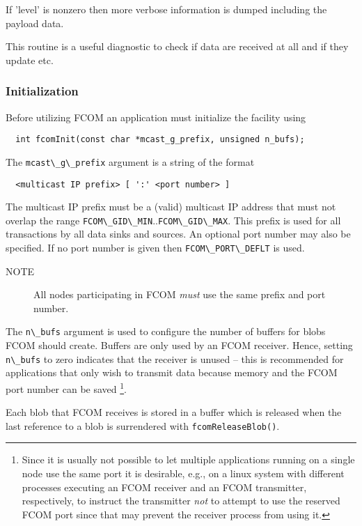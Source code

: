 \documentclass[11pt]{article}
\newcommand{\fcom}{FCOM}
\newcommand{\blob}{blob}
\newcommand{\cstl}[1]{{\lstinline+#1+}}
\newcommand{\note}[1]{
	\begin{description}
		\item[NOTE] #1
	\end{description}
}
\begin{document}
	  If 'level' is nonzero then more verbose information
      is dumped including the payload data.

	  This routine is a useful diagnostic to check if data are received
      at all and if they update etc.

    \subsubsection{Initialization}
      Before utilizing \fcom{} an application must initialize
      the facility using
      \begin{verbatim}
  int fcomInit(const char *mcast_g_prefix, unsigned n_bufs);
      \end{verbatim}
      The \cstl{mcast\_g\_prefix} argument is a string of
      the format
      \begin{verbatim}
  <multicast IP prefix> [ ':' <port number> ]
      \end{verbatim}
      The multicast IP prefix must be a (valid) multicast
      IP address that must not overlap the range
      \cstl{FCOM\_GID\_MIN}..\cstl{FCOM\_GID\_MAX}. This
      prefix is used for all transactions by all data
      sinks and sources. An optional port number may
      also be specified. If no port number is given then
      \cstl{FCOM\_PORT\_DEFLT} is used.

      \note{All nodes participating in \fcom{} {\em must} use the
      same prefix and port number.}

      The \cstl{n\_bufs} argument is used to configure the
      number of buffers for \blob{}s \fcom{} should create.
      Buffers are only used by an \fcom{} receiver. Hence,
      setting \cstl{n\_bufs} to zero indicates that the
      receiver is unused -- this is recommended for applications
      that only wish to transmit data because memory and
      the \fcom{} port number can be saved%
\footnote{Since it is usually not possible to let multiple
applications running on a single node use the same port it
is desirable, e.g., on a linux system with different
processes executing an \fcom{} receiver and an \fcom{}
transmitter, respectively, to instruct the transmitter
{\em not} to attempt to use the reserved \fcom{} port since
that may prevent the receiver process from using it.}.

      Each \blob{} that \fcom{} receives is stored in
	  a buffer which is released when the last reference
      to a \blob{} is surrendered with \cstl{fcomReleaseBlob()}.
\end{document}
